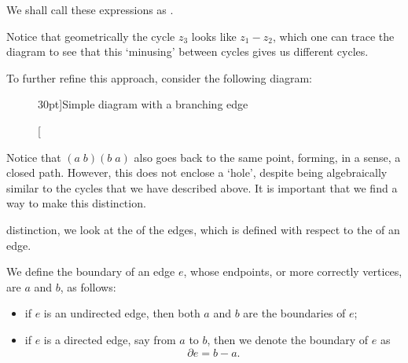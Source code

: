 \documentclass[notoc,notitlepage]{tufte-book}
\begin{document}
We shall call these expressions as .

Notice that geometrically the cycle $z_3$ looks like $z_1 - z_2$, which one can
trace the diagram to see that this `minusing' between cycles gives us different
cycles.

To further refine this approach, consider the following diagram:
\begin{figure}[ht]
  \centering
  \caption[][30pt]{Simple diagram with a branching edge}
  \label{fig:simple_diagram_with_a_branching_edge}
\end{figure}

Notice that $(a \; b)(b \; a)$ also goes back to the same point, forming, in a
sense, a closed path. However, this does not enclose a `hole', despite being
algebraically similar to the cycles that we have described above. It is
important that we find a way to make this distinction.

 distinction, we look at the  of the
edges, which is defined with respect to the  of an edge.

\begin{defn}\label{defn:boundary_of_an_edge}
  We define the boundary of an edge $e$, whose endpoints, or more correctly
  vertices, are $a$ and $b$, as follows:
  \begin{itemize}
    \item if $e$ is an undirected edge, then both $a$ and $b$ are the boundaries
      of $e$;
    \item if $e$ is a directed edge, say from $a$ to $b$, then we denote the
      boundary of $e$ as
      \begin{equation*}
        \partial e = b - a.
      \end{equation*}
  \end{itemize}
\end{defn}
\end{document}
